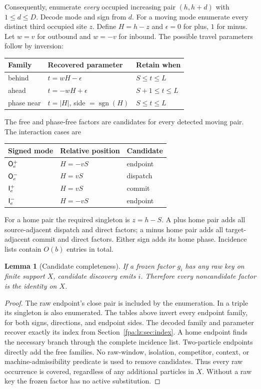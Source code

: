 \documentclass[11pt,a4paper]{article}
\numberwithin{equation}{section}
\newtheorem{lemma}[theorem]{Lemma}
\newcommand{\sgn}{\operatorname{sgn}}\newcommand{\diam}{\operatorname{diam}}
\begin{document}
Consequently, enumerate \emph{every} occupied increasing pair $(h,h+d)$ with $1\leq d\leq D$. Decode mode and sign from $d$. For a moving mode enumerate every distinct third occupied site $z$. Define $H=h-z$ and $\epsilon=0$ for plus, $1$ for minus. Let $w=v$ for outbound and $w=-v$ for inbound. The possible travel parameters follow by inversion:
\begin{center}
\begin{tabular}{@{}lll@{}}
\toprule
Family & Recovered parameter & Retain when\\
\midrule
behind & $t=wH-\epsilon$ & $S\leq t\leq L$\\
ahead & $t=-wH+\epsilon$ & $S+1\leq t\leq L$\\
phase near & $t=|H|$, side $=\sgn(H)$ & $S\leq t\leq L$\\
\bottomrule
\end{tabular}
\end{center}
The free and phase-free factors are candidates for every detected moving pair. The interaction cases are
\begin{center}
\begin{tabular}{@{}lll@{}}
\toprule
Signed mode & Relative position & Candidate\\
\midrule
$\mathsf O_e^+$ & $H=-vS$ & endpoint\\
$\mathsf O_e^-$ & $H=vS$ & dispatch\\
$\mathsf I_e^+$ & $H=vS$ & commit\\
$\mathsf I_e^-$ & $H=-vS$ & endpoint\\
\bottomrule
\end{tabular}
\end{center}
For a home pair the required singleton is $z=h-S$. A plus home pair adds all source-adjacent dispatch and direct factors; a minus home pair adds all target-adjacent commit and direct factors. Either sign adds its home phase. Incidence lists contain $O(b)$ entries in total.

\begin{lemma}[Candidate completeness]\label{fpa:lz:lem:complete}
If a frozen factor $g_i$ has any raw key on finite support $X$, candidate discovery emits $i$. Therefore every noncandidate factor is the identity on $X$.
\end{lemma}
\begin{proof}
The raw endpoint's close pair is included by the enumeration. In a triple its singleton is also enumerated. The tables above invert every endpoint family, for both signs, directions, and endpoint sides. The decoded family and parameter recover exactly its index from Section~\ref{fpa:lz:sec:index}. A home endpoint finds the necessary branch through the complete incidence list. Two-particle endpoints directly add the free families. No raw-window, isolation, competitor, context, or machine-admissibility predicate is used to remove candidates. Thus every raw occurrence is covered, regardless of any additional particles in $X$. Without a raw key the frozen factor has no active substitution.
\end{proof}
\end{document}
